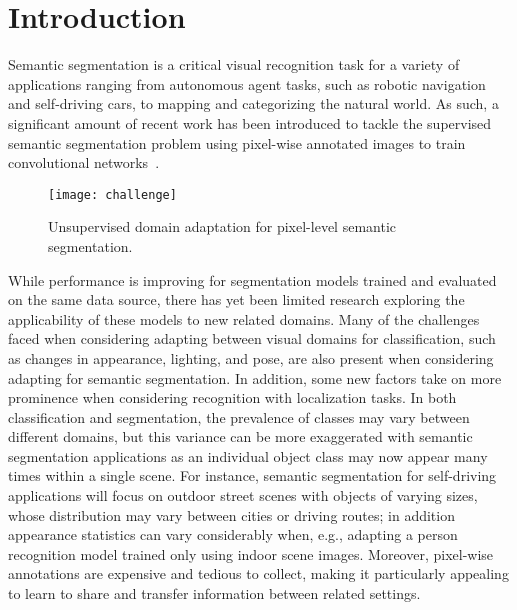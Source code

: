 \documentclass[10pt,twocolumn,letterpaper]{article}
\begin{document}
 \section{Introduction}
\label{sec:introduction}

Semantic segmentation is a critical visual recognition task for a variety of applications ranging from autonomous agent tasks, such as robotic navigation and self-driving cars, to mapping and categorizing the natural world. 
As such, a significant amount of recent work has been introduced to tackle the supervised semantic segmentation problem using pixel-wise annotated images to train convolutional networks~\cite{long2015fully,chen2015semantic,noh2015learning,zheng2015conditional,liu2015semantic,dai2016instance,yu2016multi}.

\begin{figure}[t]
	\centering
	\texttt{[image: challenge]}
	\caption{Unsupervised domain adaptation for pixel-level semantic segmentation.}
	\label{fig:challenge}
	\vspace{-5mm}
\end{figure}


While performance is improving for segmentation models trained and evaluated on the same data source, there has yet been limited research exploring the applicability of these models to new related domains. 
Many of the challenges faced when considering adapting between visual domains for classification, such as changes in appearance, lighting, and pose, are also present when considering adapting for semantic segmentation.
In addition, some new factors take on more prominence when considering recognition with localization tasks. 
In both classification and segmentation, the prevalence of classes may vary between different domains, but this variance can be more exaggerated with semantic segmentation applications as an individual object class may now appear many times within a single scene. For instance, semantic segmentation for self-driving applications will focus on outdoor street scenes with objects of varying sizes, whose distribution may vary between cities or driving routes; in addition appearance statistics can vary considerably when, e.g., adapting a person recognition model trained only using indoor scene images. 
Moreover, pixel-wise annotations are expensive and tedious to collect, making it particularly appealing to learn to share and transfer information between related settings. 
\end{document}
